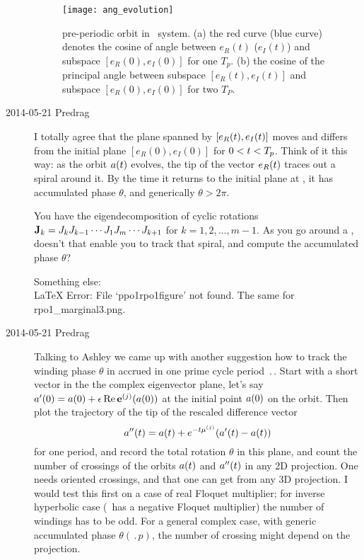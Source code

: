\begin{description}
  \begin{figure}[h]
    \centering
    \texttt{[image: ang\_evolution]}
    \caption{pre-periodic orbit  in \KS\ system.
      (a) the red curve (blue curve) denotes the cosine of angle
      between $e_R(t)$ ($e_I(t)$) and subspace $[e_R(0),e_I(0)]$
      for one $T_p$.
      (b) the cosine of the principal angle between subspace
      $[e_R(t),e_I(t)]$
      and subspace $[e_R(0),e_I(0)]$ for two $T_P$.
    }
    \label{fig:ang_evolution}
  \end{figure}

\item[2014-05-21 Predrag]
I totally agree that the plane spanned by $[e_R(\zeit),e_I(\zeit)]$
moves and differs from
the initial plane $[e_R(0),e_I(0)]$ for $0<\zeit<\period{p}$. Think of it this way:
as the orbit $\ssp(\zeit)$ evolves, the tip of the vector $e_R(\zeit)$ traces
out a spiral around it. By the time it returns to the initial plane at ,
it has accumulated phase $\theta$, and generically $\theta>2\pi$.

You have the eigendecomposition of cyclic rotations
${\bf J}_{k}=J_{k}J_{k-1}\cdots J_{1}J_{m}\cdots J_{k+1}$ for
$k=1,2,\dots,m\!-\!1$. As you go around a \po, doesn't that
enable you to track that spiral, and compute the accumulated phase $\theta$?

Something else:
\\
LaTeX Error: File `ppo1rpo1figure' not found. The same for rpo1\_marginal3.png.

\item[2014-05-21 Predrag] Talking to Ashley we came up with another
suggestion how to track the winding phase $\theta$ in
 accrued in one prime cycle period $\period{}$. Start
with a short vector in the the complex eigenvector plane, let's say
$\ssp'(0) = \ssp(0) + \epsilon \, \Re \jEigvec[j](\ssp(0))$ at the initial point $\ssp(0)$ on
the orbit. Then plot the trajectory of the tip of the rescaled
difference vector
\begin{equation}
\ssp''(\zeit) = \ssp(\zeit) + e^{-\zeit\eigRe[j]}(\ssp'(\zeit) - \ssp(\zeit))
\label{eq:evolve_diff}
\end{equation}
for one period, and record the total rotation
$\theta$ in this plane, and count the number of crossings of the orbits
$\ssp(\zeit)$ and $\ssp''(\zeit)$ in any 2D projection. One needs oriented
crossings, and that one can get from any 3D projection. I would test this
first on a case of real Floquet multiplier; for inverse hyperbolic case
(\po\ has a negative Floquet multiplier) the number of windings has to be
odd. For a general complex case, with generic accumulated phase
$\theta(\period{p})$, the number of crossing might depend on the
projection.


\end{description}
